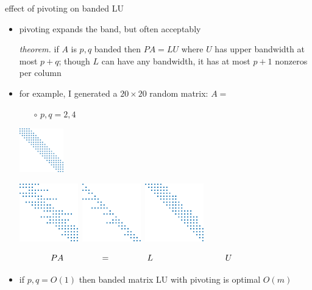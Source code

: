 \documentclass[10pt,
               svgnames,
               hyperref={colorlinks,citecolor=DeepPink4,linkcolor=FireBrick,urlcolor=Maroon},
               usepdftitle=false]{beamer}
\begin{document}
\begin{frame}{effect of pivoting on banded LU}

\begin{itemize}
\item pivoting expands the band, but often acceptably

\bigskip
\emph{theorem.} if $A$ is $p,q$ banded then $PA=LU$ where $U$ has upper bandwidth at most $p+q$; though $L$ can have any bandwidth, it has at most $p+1$ nonzeros per column

\bigskip
\item for example, I generated a $20\times 20$ random matrix: \qquad $A=$
   \begin{itemize}
   \item[$\circ$] $p,q=2,4$
   \end{itemize}

\vspace{-12mm}
\hfill \includegraphics[width=0.15\textwidth]{images/banded-A.png}

\vspace{-3mm}
\mbox{\includegraphics[width=0.2\textwidth]{images/banded-PA.png} \qquad \qquad \includegraphics[width=0.2\textwidth]{images/banded-L.png} \includegraphics[width=0.2\textwidth]{images/banded-U.png}}

\vspace{-3mm}
$$PA \hspace{15mm} = \hspace{15mm} L \hspace{30mm} U \hspace{20mm}$$

\medskip
\item if $p,q=O(1)$ then banded matrix LU with pivoting is optimal $O(m)$
\end{itemize}
\end{frame}
\end{document}
